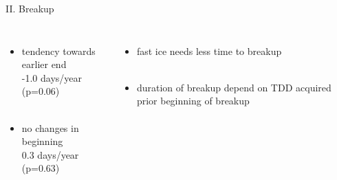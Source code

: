 \documentclass[8pt]{beamer}
\begin{document}
\begin{frame}[fragile]{II. Breakup}
	\begin{columns}
		\begin{itemize}
			\item{tendency towards earlier end\\ -1.0 days/year (p=0.06)}\\~\\
			\item{no changes in beginning \\ 0.3 days/year (p=0.63)\\}
		\end{itemize}
		\begin{itemize}
			\item{fast ice needs less time to breakup}\\~\\
			\item{duration of breakup depend on TDD acquired prior beginning of breakup }
		\end{itemize}
	\end{columns}
\end{frame}

\end{document}

